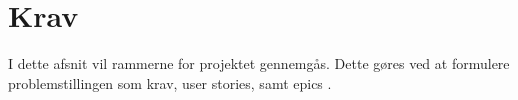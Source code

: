 \chapter{Krav}
\label{cha:requirements}

I dette afsnit vil rammerne for projektet gennemgås. Dette gøres ved at formulere problemstillingen som krav, user stories, samt epics \cite[Epic]{converge-terms}.

